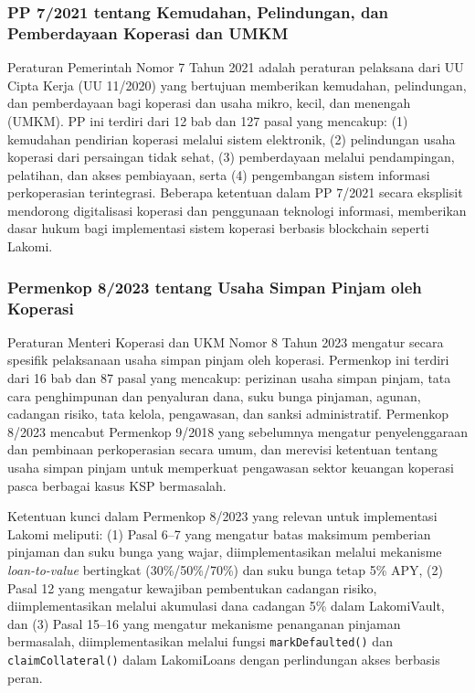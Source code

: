 \subsubsection{PP 7/2021 tentang Kemudahan, Pelindungan, dan Pemberdayaan Koperasi dan UMKM}

Peraturan Pemerintah Nomor 7 Tahun 2021 \cite{pp72021} adalah peraturan pelaksana dari UU Cipta Kerja (UU 11/2020) yang bertujuan memberikan kemudahan, pelindungan, dan pemberdayaan bagi koperasi dan usaha mikro, kecil, dan menengah (UMKM). PP ini terdiri dari 12 bab dan 127 pasal yang mencakup: (1) kemudahan pendirian koperasi melalui sistem elektronik, (2) pelindungan usaha koperasi dari persaingan tidak sehat, (3) pemberdayaan melalui pendampingan, pelatihan, dan akses pembiayaan, serta (4) pengembangan sistem informasi perkoperasian terintegrasi. Beberapa ketentuan dalam PP 7/2021 secara eksplisit mendorong digitalisasi koperasi dan penggunaan teknologi informasi, memberikan dasar hukum bagi implementasi sistem koperasi berbasis blockchain seperti Lakomi.

\subsubsection{Permenkop 8/2023 tentang Usaha Simpan Pinjam oleh Koperasi}

Peraturan Menteri Koperasi dan UKM Nomor 8 Tahun 2023 \cite{permenkop82023} mengatur secara spesifik pelaksanaan usaha simpan pinjam oleh koperasi. Permenkop ini terdiri dari 16 bab dan 87 pasal yang mencakup: perizinan usaha simpan pinjam, tata cara penghimpunan dan penyaluran dana, suku bunga pinjaman, agunan, cadangan risiko, tata kelola, pengawasan, dan sanksi administratif. Permenkop 8/2023 mencabut Permenkop 9/2018 \cite{permenkop92018} yang sebelumnya mengatur penyelenggaraan dan pembinaan perkoperasian secara umum, dan merevisi ketentuan tentang usaha simpan pinjam untuk memperkuat pengawasan sektor keuangan koperasi pasca berbagai kasus KSP bermasalah.

Ketentuan kunci dalam Permenkop 8/2023 yang relevan untuk implementasi Lakomi meliputi: (1) Pasal 6--7 yang mengatur batas maksimum pemberian pinjaman dan suku bunga yang wajar, diimplementasikan melalui mekanisme \textit{loan-to-value} bertingkat (30\%/50\%/70\%) dan suku bunga tetap 5\% APY, (2) Pasal 12 yang mengatur kewajiban pembentukan cadangan risiko, diimplementasikan melalui akumulasi dana cadangan 5\% dalam LakomiVault, dan (3) Pasal 15--16 yang mengatur mekanisme penanganan pinjaman bermasalah, diimplementasikan melalui fungsi \texttt{markDefaulted()} dan \texttt{claimCollateral()} dalam LakomiLoans dengan perlindungan akses berbasis peran.

